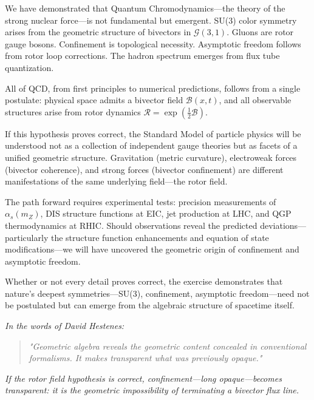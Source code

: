 \documentclass[11pt,a4paper]{article}
\newcommand{\Rotor}{\mathcal{R}}
\newcommand{\Biv}{\mathcal{B}}
\newcommand{\Cl}{\mathcal{G}}
\theoremstyle{definition}
\theoremstyle{plain}
\theoremstyle{remark}
\begin{document}
We have demonstrated that Quantum Chromodynamics---the theory of the strong nuclear force---is not fundamental but emergent. SU(3) color symmetry arises from the geometric structure of bivectors in $\Cl(3,1)$. Gluons are rotor gauge bosons. Confinement is topological necessity. Asymptotic freedom follows from rotor loop corrections. The hadron spectrum emerges from flux tube quantization.

All of QCD, from first principles to numerical predictions, follows from a single postulate: physical space admits a bivector field $\Biv(x,t)$, and all observable structures arise from rotor dynamics $\Rotor = \exp(\frac{1}{2}\Biv)$.

If this hypothesis proves correct, the Standard Model of particle physics will be understood not as a collection of independent gauge theories but as facets of a unified geometric structure. Gravitation (metric curvature), electroweak forces (bivector coherence), and strong forces (bivector confinement) are different manifestations of the same underlying field---the rotor field.

The path forward requires experimental tests: precision measurements of $\alpha_s(m_Z)$, DIS structure functions at EIC, jet production at LHC, and QGP thermodynamics at RHIC. Should observations reveal the predicted deviations---particularly the structure function enhancements and equation of state modifications---we will have uncovered the geometric origin of confinement and asymptotic freedom.

Whether or not every detail proves correct, the exercise demonstrates that nature's deepest symmetries---SU(3), confinement, asymptotic freedom---need not be postulated but can emerge from the algebraic structure of spacetime itself.

\vspace{1em}

\noindent\textit{In the words of David Hestenes:}

\begin{quote}
\textit{"Geometric algebra reveals the geometric content concealed in conventional formalisms. It makes transparent what was previously opaque."}
\end{quote}

\vspace{1em}

\noindent\textit{If the rotor field hypothesis is correct, confinement---long opaque---becomes transparent: it is the geometric impossibility of terminating a bivector flux line.}
\end{document}
